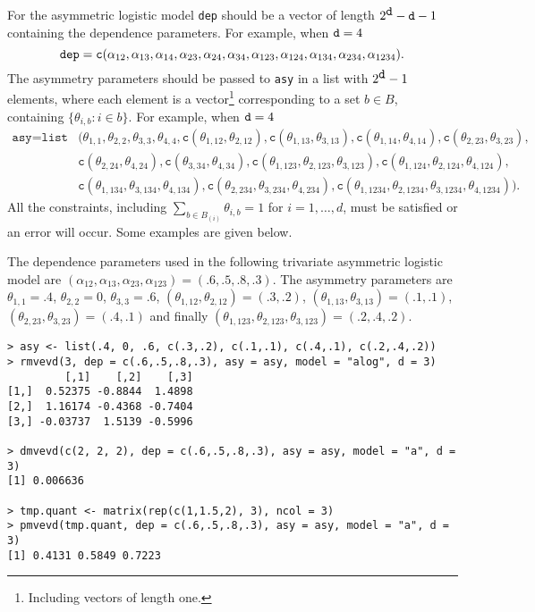 \documentclass[11pt,a4paper]{article}
\begin{document}
For the asymmetric logistic model \verb+dep+ should be a vector of length $2^{\verb+d+}-\verb+d+-1$ containing the dependence parameters.
For example, when $\verb+d+ = 4$
\begin{equation*}
\verb+dep+ = \texttt{c}(\alpha_{12},\alpha_{13},\alpha_{14},\alpha_{23},\alpha_{24},\alpha_{34},\alpha_{123},\alpha_{124},\alpha_{134},\alpha_{234},\alpha_{1234}).
\end{equation*}
The asymmetry parameters should be passed to \verb+asy+ in a list with $2^{\verb+d+}-1$ elements, where each element is a vector\footnote{
Including vectors of length one.} 
corresponding to a set $b \in B$, containing $\{\theta_{i,b}:i \in b\}$.
For example, when $\verb+d+ = 4$
\begin{align*}
\texttt{asy} = \texttt{list}&(\theta_{1,1}, \theta_{2,2}, \theta_{3,3}, \theta_{4,4}, \texttt{c}(\theta_{1,12},\theta_{2,12}), \texttt{c}(\theta_{1,13},\theta_{3,13}), \texttt{c}(\theta_{1,14},\theta_{4,14}), \texttt{c}(\theta_{2,23},\theta_{3,23}), \\
&\texttt{c}(\theta_{2,24},\theta_{4,24}), \texttt{c}(\theta_{3,34},\theta_{4,34}), \texttt{c}(\theta_{1,123},\theta_{2,123},\theta_{3,123}), \texttt{c}(\theta_{1,124},\theta_{2,124},\theta_{4,124}), \\
&\texttt{c}(\theta_{1,134},\theta_{3,134},\theta_{4,134}), \texttt{c}(\theta_{2,234},\theta_{3,234},\theta_{4,234}), \texttt{c}(\theta_{1,1234},\theta_{2,1234},\theta_{3,1234},\theta_{4,1234})).
\end{align*}
All the constraints, including  $\sum_{b \in B_{(i)}}\theta_{i,b}=1$ for $i=1,\dots,d$, must be satisfied or an error will occur.
Some examples are given below.

The dependence parameters used in the following trivariate asymmetric logistic model are $(\alpha_{12},\alpha_{13},\alpha_{23},\alpha_{123})=(.6,.5,.8,.3)$.
The asymmetry parameters are $\theta_{1,1}=.4$, $\theta_{2,2}=0$, $\theta_{3,3}=.6$, $(\theta_{1,12},\theta_{2,12})=(.3,.2)$, $(\theta_{1,13},\theta_{3,13})=(.1,.1)$, $(\theta_{2,23},\theta_{3,23})=(.4,.1)$ and finally $(\theta_{1,123},\theta_{2,123},\theta_{3,123})=(.2,.4,.2)$.

\begin{verbatim}
> asy <- list(.4, 0, .6, c(.3,.2), c(.1,.1), c(.4,.1), c(.2,.4,.2))
> rmvevd(3, dep = c(.6,.5,.8,.3), asy = asy, model = "alog", d = 3)
         [,1]    [,2]    [,3]
[1,]  0.52375 -0.8844  1.4898
[2,]  1.16174 -0.4368 -0.7404
[3,] -0.03737  1.5139 -0.5996

> dmvevd(c(2, 2, 2), dep = c(.6,.5,.8,.3), asy = asy, model = "a", d = 3)
[1] 0.006636

> tmp.quant <- matrix(rep(c(1,1.5,2), 3), ncol = 3)
> pmvevd(tmp.quant, dep = c(.6,.5,.8,.3), asy = asy, model = "a", d = 3)
[1] 0.4131 0.5849 0.7223
\end{verbatim}
\end{document}

